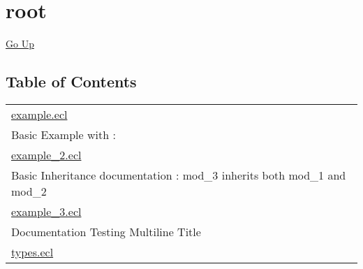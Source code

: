 \chapter*{\color{headtoc} root}
\hypertarget{ecldoc:toc:root}{}
\hyperlink{ecldoc:toc:}{Go Up}


\section*{Table of Contents}
{\renewcommand{\arraystretch}{1.5}
\begin{longtable}{|p{\textwidth}|}
\hline
\hyperlink{ecldoc:toc:example}{example.ecl} \\
Basic Example with : \\
\hline
\hyperlink{ecldoc:toc:example_2}{example\_2.ecl} \\
Basic Inheritance documentation : mod\_3 inherits both mod\_1 and mod\_2 \\
\hline
\hyperlink{ecldoc:toc:example_3}{example\_3.ecl} \\
Documentation Testing Multiline Title \\
\hline
\hyperlink{ecldoc:toc:types}{types.ecl} \\
\hline
\end{longtable}
}






